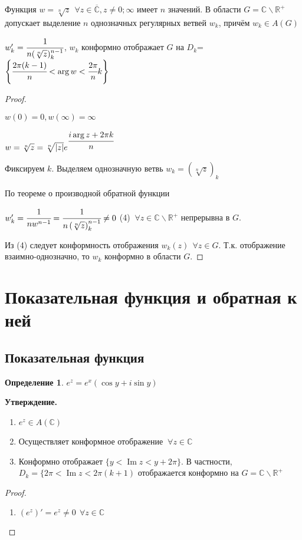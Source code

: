 \documentclass[final]{report}
\newcommand{\forcenewline}{$\phantom{\mbox{newline}}$\newline}
\newcommand{\R}{\mathbb{R}}
\renewcommand{\C}{\mathbb{C}}
\renewcommand{\bar}{\overline}
\renewcommand{\Im}{\mathop{\mathrm{Im}}\nolimits}
\newcommand{\F}{\ \forall}
\newcommand{\CC}{\bar{\C}}
\newcommand{\opr}[1]{\begin{opred}#1\end{opred}}
\newtheorem*{opred}{Определение}
\theoremstyle{remark}
\begin{document}
Функция $w=\sqrt[n]{z}\ \F z\in\CC,z\neq 0;\infty$ имеет $n$ значений. В области $G=\C\smallsetminus\R^+$ допускает выделение $n$ однозначных регулярных ветвей $w_k$, причём $w_k\in A(G)$

$w_k'=\cfrac{1}{n(\sqrt[n]{z})^{n-1}_k}$, $w_k$ конформно отображает $G$ на $D_k$=$\left\{\cfrac{2\pi(k-1)}{n}<\arg w<\cfrac{2\pi}{n}k\right\}$

\begin{proof}
\forcenewline

$w(0)=0, w(\infty)=\infty$

$w=\sqrt[n]{z}=\sqrt[n]{|z|}e^{\cfrac{i\arg z+2\pi k}{n}}$

Фиксируем $k$. Выделяем однозначную ветвь $w_k=\left(\sqrt[n]{z}\right)_k$

По теореме о производной обратной функции

$w_k'=\cfrac{1}{nw^{n-1}}=\cfrac{1}{n\left(\sqrt[n]{z}\right)^{n-1}_k}\neq 0$ (4) $\F z\in\C\smallsetminus\R^+$ непрерывна в $G$.

Из (4) следует конформность отображения $w_k(z)\ \F z\in G$. Т.к. отображение взаимно-однозначно, то $w_k$ конформно в области $G$.
\end{proof}

\newpage

\section{Показательная функция и обратная к ней}

\subsection{Показательная функция}

\opr{$e^z=e^x(\cos y+i\sin y)$}
{\bfseries Утверждение.}
\begin{enumerate}
\item $e^z\in A(\C)$
\item Осуществляет конформное отображение $\F z\in\C$
\item Конформно отображает $\{y<\Im z<y+2\pi\}$. В частности, $D_k=\{2\pi <\Im z<2\pi(k+1)$ отображается конформно на $G=\C\smallsetminus\R^+$
\end{enumerate}
\begin{proof}
\forcenewline
\begin{enumerate}
\item $(e^z)'=e^z\neq0\ \F z\in\C$
\end{enumerate}
\end{proof}
\end{document}
